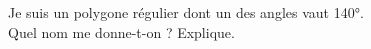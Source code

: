 %
%
    Je suis un polygone régulier dont un des angles vaut \ang{140}.\\
    Quel nom me donne-t-on ? Explique.
